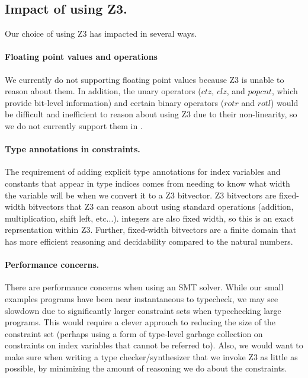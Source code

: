 \subsection{Impact of using Z3.}
Our choice of using Z3 has impacted \name in several ways.

\paragraph{Floating point values and operations}
We currently do not supporting floating point values because Z3 is unable to reason about them.
In addition, the \wasm unary operators ($ctz$, $clz$, and $popcnt$, which provide bit-level information) and certain binary operators ($rotr$ and $rotl$) would be difficult and inefficient to reason about using Z3 due to their non-linearity, so we do not currently support them in \name.

\paragraph{Type annotations in constraints.}
The requirement of adding explicit type annotations for index variables and constants that appear in type indices comes from needing to know what width the variable will be when we convert it to a Z3 bitvector.
Z3 bitvectors are fixed-width bitvectors that Z3 can reason about using standard operations (addition, multiplication, shift left, etc...).
\name integers are also fixed width, so this is an exact reprsentation within Z3.
Further, fixed-width bitvectors are a finite domain that has more efficient reasoning and decidability compared to the natural numbers.

\paragraph{Performance concerns.}
There are performance concerns when using an SMT solver.
While our small examples programs have been near instantaneous to typecheck, we may see slowdown due to significantly larger constraint sets when typechecking large \wasm programs.
This would require a clever approach to reducing the size of the constraint set (perhaps using a form of type-level garbage collection on constraints on index variables that cannot be referred to).
Also, we would want to make sure when writing a type checker/synthesizer that we invoke Z3 as little as possible, by minimizing the amount of reasoning we do about the constraints.
